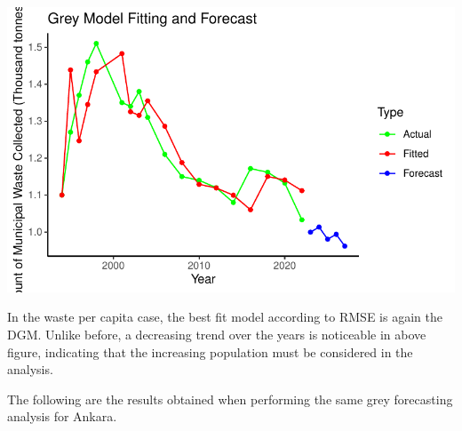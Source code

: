 \documentclass[
  11pt,
  a4paper,
  DIV=11,
  numbers=noendperiod]{scrartcl}
\begin{document}
\includegraphics{project_files/figure-pdf/unnamed-chunk-51-1.pdf}

In the waste per capita case, the best fit model according to RMSE is
again the DGM. Unlike before, a decreasing trend over the years is
noticeable in above figure, indicating that the increasing population
must be considered in the analysis.

The following are the results obtained when performing the same grey
forecasting analysis for Ankara.
\end{document}
